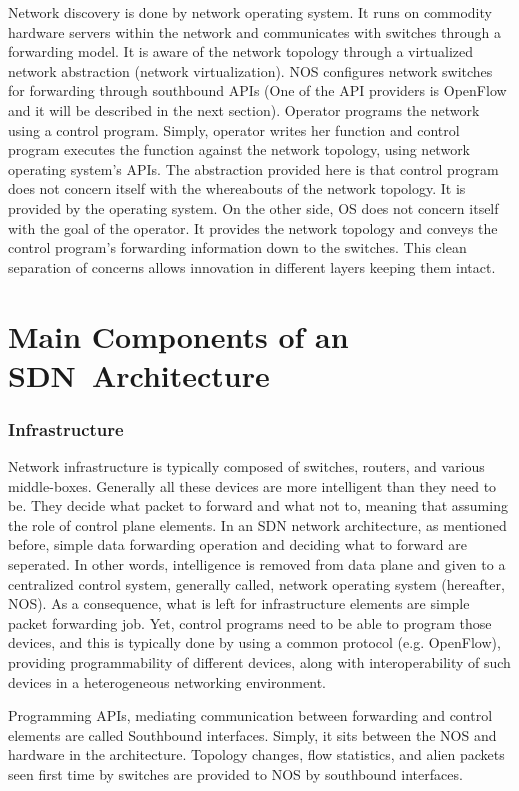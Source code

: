 \documentclass[12pt,journal,compsoc]{IEEEtran}
\begin{document}
Network discovery is done by network operating system. It runs on commodity 
hardware servers within the network and communicates with switches through 
a forwarding model. It is aware of the network topology through a 
virtualized network abstraction (network virtualization). NOS 
configures network switches for forwarding through southbound APIs 
(One of the API providers is OpenFlow and it will be described 
in the next section). Operator programs the network using a control 
program. Simply, operator writes her function and control 
program executes the function against the network topology, using 
network operating system’s APIs. The abstraction provided here is 
that control program does not concern itself with the whereabouts of 
the network topology. It is provided by the operating system. 
On the other side, OS does not concern itself with the goal of 
the operator. It provides the network topology and conveys the control 
program’s forwarding information down to the switches. 
This clean separation of concerns allows innovation in different 
layers keeping them intact. 



\section{Main Components of an SDN~Architecture}

\subsubsection{Infrastructure}
Network infrastructure is typically composed of switches, routers, and various middle-boxes.
Generally all these devices are more intelligent than they need to be. They decide what
packet to forward and what not to, meaning that assuming the role of control plane elements.
In an SDN network architecture, as mentioned before, simple data forwarding operation and 
deciding what to forward are seperated. In other words, intelligence is removed from data 
plane and given to a centralized control system, generally called, network operating system 
(hereafter, NOS). As a consequence, what is left for infrastructure elements are simple 
packet forwarding job. Yet, control programs need to be able to program those devices, 
and this is typically done by using a common protocol (e.g. OpenFlow), providing 
programmability of different devices, along with interoperability of such devices 
in a heterogeneous networking environment.

Programming APIs, mediating communication between forwarding and control elements
are called Southbound interfaces.
Simply, it sits between the NOS and hardware in the architecture. Topology changes,
 flow statistics, and alien packets seen first time by switches are provided to 
NOS by southbound interfaces.
\end{document}
